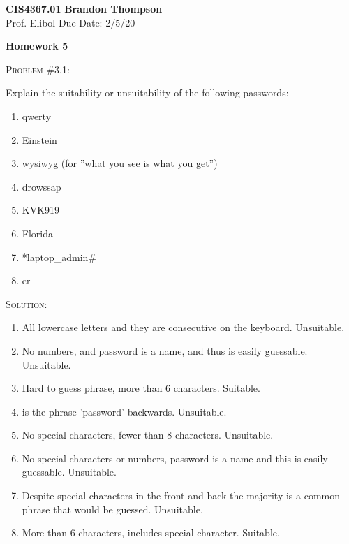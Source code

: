 \documentclass[12pt]{article}
\newenvironment{problem}[1]
{\begin{mdframed}[linewidth=0.8pt]
        \textsc{Problem #1:}

}
    {\end{mdframed}}
\newenvironment{solution}
    {\textsc{Solution:}\\}
    {\newpage}%
\begin{document}
\noindent
\textbf{CIS4367.01} \hfill \textbf{Brandon Thompson} \\
\normalsize Prof. Elibol \hfill Due Date: 2/5/20 \\

\begin{center}
\textbf{Homework 5}
\end{center}
	
	\begin{problem}{\#3.1}
		Explain the suitability or unsuitability of the following passwords:
		\begin{enumerate}[label=\alph*]
			\item qwerty
			\item Einstein
			\item wysiwyg (for ''what you see is what you get'')
			\item drowssap
			\item KVK919
			\item Florida
			\item *laptop\_admin\#
			\item cr\@zyp@ss
		\end{enumerate}
	\end{problem}
	\begin{solution}
		\begin{enumerate}[label=\alph*]
			\item All lowercase letters and they are consecutive on the
				keyboard. Unsuitable.
			\item No numbers, and password is a name, and thus is easily guessable.
				Unsuitable.
			\item Hard to guess phrase, more than 6 characters. Suitable.
			\item is the phrase 'password' backwards. Unsuitable.
			\item No special characters, fewer than 8 characters. Unsuitable.
			\item No special characters or numbers, password is a name and this is
				easily guessable. Unsuitable.
			\item Despite special characters in the front and back the majority is
				a common phrase that would be guessed. Unsuitable.
			\item More than 6 characters, includes special character. Suitable.
		\end{enumerate}
	\end{solution}
\end{document}
